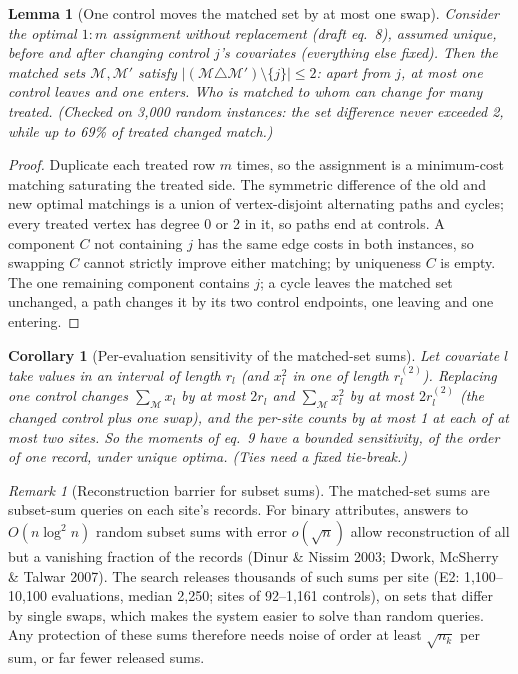 \documentclass[11pt]{article}
\newtheorem{lemma}[proposition]{Lemma}
\newtheorem{corollary}[proposition]{Corollary}
\theoremstyle{remark}
\newtheorem{remark}[proposition]{Remark}
\begin{document}
\begin{lemma}[One control moves the matched set by at most one swap]\label{lem:swap}
Consider the optimal $1{:}m$ assignment without replacement (draft eq.~8), assumed unique,
before and after changing control $j$'s covariates (everything else fixed). Then the matched
sets $\mathcal M,\mathcal M'$ satisfy $|(\mathcal M\triangle\mathcal M')\setminus\{j\}|\le2$:
apart from $j$, at most one control leaves and one enters. Who is matched to whom can change for
many treated. \emph{(Checked on 3,000 random instances: the set difference never exceeded 2,
while up to 69\% of treated changed match.)}
\end{lemma}
\begin{proof}
Duplicate each treated row $m$ times, so the assignment is a minimum-cost matching saturating
the treated side. The symmetric difference of the old and new optimal matchings is a union of
vertex-disjoint alternating paths and cycles; every treated vertex has degree 0 or 2 in it, so
paths end at controls. A component $C$ not containing $j$ has the same edge costs in both
instances, so swapping $C$ cannot strictly improve either matching; by uniqueness $C$ is
empty. The one remaining component contains $j$; a cycle leaves the matched set unchanged, a
path changes it by its two control endpoints, one leaving and one entering.
\end{proof}

\begin{corollary}[Per-evaluation sensitivity of the matched-set sums]
Let covariate $l$ take values in an interval of length $r_l$ (and $x_l^2$ in one of length
$r^{(2)}_l$). Replacing one control changes $\sum_{\mathcal M}x_l$ by at most $2r_l$ and
$\sum_{\mathcal M}x_l^2$ by at most $2r^{(2)}_l$ (the changed control plus one swap), and the
per-site counts by at most 1 at each of at most two sites. So the moments of eq.~9 have a bounded
sensitivity, of the order of one record, under unique optima. (Ties need a fixed tie-break.)
\end{corollary}

\begin{remark}[Reconstruction barrier for subset sums]
The matched-set sums are subset-sum queries on each site's records. For binary attributes,
answers to $O(n\log^2n)$ random subset sums with error $o(\sqrt n)$ allow reconstruction of
all but a vanishing fraction of the records (Dinur \& Nissim 2003; Dwork, McSherry \& Talwar
2007). The search releases thousands of such sums per site (E2: 1,100--10,100 evaluations,
median 2,250; sites of 92--1,161 controls), on sets that differ by single swaps, which makes the system
easier to solve than random queries. Any protection of these sums therefore needs noise of
order at least $\sqrt{n_k}$ per sum, or far fewer released sums.
\end{remark}
\end{document}
